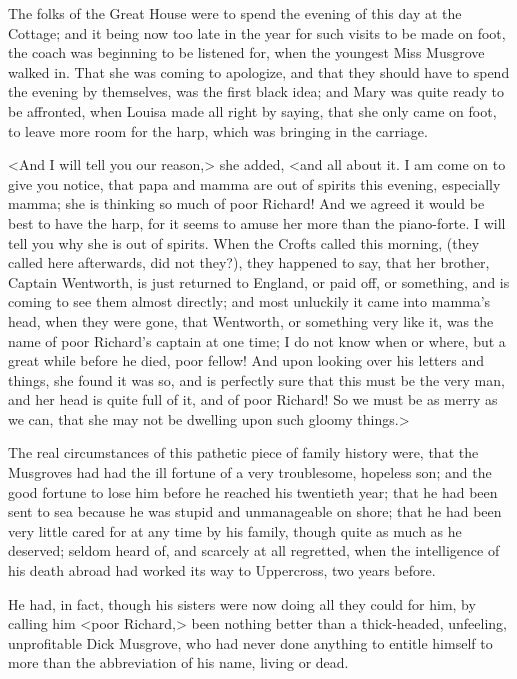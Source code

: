 The folks of the Great House were to spend the evening of this day at the Cottage; and it being now too late in the year for such visits to be made on foot, the coach was beginning to be listened for, when the youngest Miss Musgrove walked in. That she was coming to apologize, and that they should have to spend the evening by themselves, was the first black idea; and Mary was quite ready to be affronted, when Louisa made all right by saying, that she only came on foot, to leave more room for the harp, which was bringing in the carriage.

<And I will tell you our reason,> she added, <and all about it. I am come on to give you notice, that papa and mamma are out of spirits this evening, especially mamma; she is thinking so much of poor Richard! And we agreed it would be best to have the harp, for it seems to amuse her more than the piano-forte. I will tell you why she is out of spirits. When the Crofts called this morning, (they called here afterwards, did not they?), they happened to say, that her brother, Captain Wentworth, is just returned to England, or paid off, or something, and is coming to see them almost directly; and most unluckily it came into mamma's head, when they were gone, that Wentworth, or something very like it, was the name of poor Richard's captain at one time; I do not know when or where, but a great while before he died, poor fellow! And upon looking over his letters and things, she found it was so, and is perfectly sure that this must be the very man, and her head is quite full of it, and of poor Richard! So we must be as merry as we can, that she may not be dwelling upon such gloomy things.>

The real circumstances of this pathetic piece of family history were, that the Musgroves had had the ill fortune of a very troublesome, hopeless son; and the good fortune to lose him before he reached his twentieth year; that he had been sent to sea because he was stupid and unmanageable on shore; that he had been very little cared for at any time by his family, though quite as much as he deserved; seldom heard of, and scarcely at all regretted, when the intelligence of his death abroad had worked its way to Uppercross, two years before.

He had, in fact, though his sisters were now doing all they could for him, by calling him <poor Richard,> been nothing better than a thick-headed, unfeeling, unprofitable Dick Musgrove, who had never done anything to entitle himself to more than the abbreviation of his name, living or dead.

